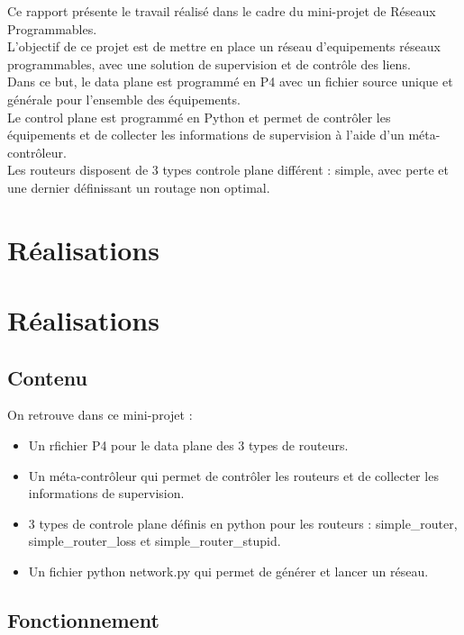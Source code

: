 \documentclass[12pt,a4paper]{report}
\newcommand*\sectiontitle{}
\let\origsection\section
\renewcommand*{\section}[2][]{%
\ifx\setminus#1\setminus%
  \origsection{#2}%
  \renewcommand*\sectiontitle{#2}%
\else
  \origsection[#1]{#2}%
  \renewcommand*\sectiontitle{#1}%
\fi
}
\begin{document}
    \begin{card}
    Ce rapport présente le travail réalisé dans le cadre du mini-projet de Réseaux Programmables. \\
    L'objectif de ce projet est de mettre en place un réseau d'equipements réseaux programmables, avec une solution de supervision et de contrôle des liens. \\
    Dans ce but, le data plane est programmé en P4 avec un fichier source unique et générale pour l'ensemble des équipements. \\
    Le control plane est programmé en Python et permet de contrôler les équipements et de collecter les informations de supervision à l'aide d'un méta-contrôleur. \\
    Les routeurs disposent de 3 types controle plane différent : simple, avec perte et  une dernier définissant un routage non optimal. \\
    \end{card}

\section{Réalisations}

    \subsection{Contenu}

    \begin{card}
        On retrouve dans ce mini-projet : 
        \begin{itemize}
            \item Un rfichier P4 pour le data plane des 3 types de routeurs.
            \item Un méta-contrôleur qui permet de contrôler les routeurs et de collecter les informations de supervision.
            \item 3 types de controle plane définis en python pour les routeurs : simple_router, simple_router_loss et simple_router_stupid.
            \item Un fichier python network.py qui permet de générer et lancer un réseau.
        \end{itemize}
    \end{card}

    \subsection{Fonctionnement}
\end{document}
